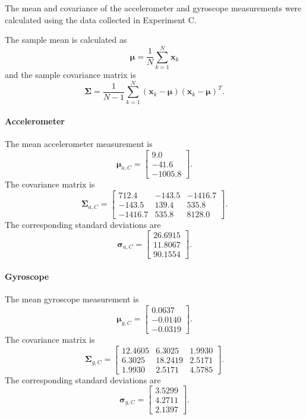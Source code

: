 \documentclass[10pt,a4paper]{article}
\newenvironment{answer}{%
  \begin{tcolorbox}[breakable,enhanced,colback=white,colframe=greyline,
    boxrule=0.6pt,arc=2pt,left=8pt,right=8pt,top=7pt,bottom=7pt,
    before skip=0pt,after skip=12pt]
}{\end{tcolorbox}}
\begin{document}
\begin{answer}
The mean and covariance of the accelerometer and gyroscope measurements were calculated using the data collected in Experiment C.

The sample mean is calculated as
\[
\boldsymbol{\mu}=\frac{1}{N}\sum_{k=1}^{N}\mathbf{x}_k
\]
and the sample covariance matrix is
\[
\boldsymbol{\Sigma}=
\frac{1}{N-1}\sum_{k=1}^{N}
(\mathbf{x}_k-\boldsymbol{\mu})
(\mathbf{x}_k-\boldsymbol{\mu})^T.
\]

\paragraph{Accelerometer}
The mean accelerometer measurement is
\[
\boldsymbol{\mu}_{a,C}=
\begin{bmatrix}
9.0\\
-41.6\\
-1005.8
\end{bmatrix}.
\]
The covariance matrix is
\[
\boldsymbol{\Sigma}_{a,C}=
\begin{bmatrix}
712.4 & -143.5 & -1416.7\\
-143.5 & 139.4 & 535.8\\
-1416.7 & 535.8 & 8128.0
\end{bmatrix}.
\]
The corresponding standard deviations are
\[
\boldsymbol{\sigma}_{a,C}=
\begin{bmatrix}
26.6915\\
11.8067\\
90.1554
\end{bmatrix}.
\]

\paragraph{Gyroscope}
The mean gyroscope measurement is
\[
\boldsymbol{\mu}_{g,C}=
\begin{bmatrix}
0.0637\\
-0.0140\\
-0.0319
\end{bmatrix}.
\]
The covariance matrix is
\[
\boldsymbol{\Sigma}_{g,C}=
\begin{bmatrix}
12.4605 & 6.3025 & 1.9930\\
6.3025 & 18.2419 & 2.5171\\
1.9930 & 2.5171 & 4.5785
\end{bmatrix}.
\]
The corresponding standard deviations are
\[
\boldsymbol{\sigma}_{g,C}=
\begin{bmatrix}
3.5299\\
4.2711\\
2.1397
\end{bmatrix}.
\]


\end{answer}
\end{document}
